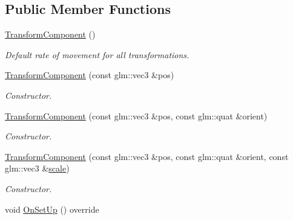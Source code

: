 \subsection*{Public Member Functions}
\begin{DoxyCompactItemize}
\item 
\hypertarget{class_transform_component_ace1cf2d7d2a7468e9cb3eb0ce382f446}{\hyperlink{class_transform_component_ace1cf2d7d2a7468e9cb3eb0ce382f446}{Transform\+Component} ()}\label{class_transform_component_ace1cf2d7d2a7468e9cb3eb0ce382f446}

\begin{DoxyCompactList}\small\item\em Default rate of movement for all transformations. \end{DoxyCompactList}\item 
\hypertarget{class_transform_component_a01037615eda19c3bbb51c99094839574}{\hyperlink{class_transform_component_a01037615eda19c3bbb51c99094839574}{Transform\+Component} (const glm\+::vec3 \&pos)}\label{class_transform_component_a01037615eda19c3bbb51c99094839574}

\begin{DoxyCompactList}\small\item\em Constructor. \end{DoxyCompactList}\item 
\hypertarget{class_transform_component_a05ce9d2b5a350a5d8d67ce6b323818d4}{\hyperlink{class_transform_component_a05ce9d2b5a350a5d8d67ce6b323818d4}{Transform\+Component} (const glm\+::vec3 \&pos, const glm\+::quat \&orient)}\label{class_transform_component_a05ce9d2b5a350a5d8d67ce6b323818d4}

\begin{DoxyCompactList}\small\item\em Constructor. \end{DoxyCompactList}\item 
\hypertarget{class_transform_component_aa823162adc73870484409dcdb8cc95f3}{\hyperlink{class_transform_component_aa823162adc73870484409dcdb8cc95f3}{Transform\+Component} (const glm\+::vec3 \&pos, const glm\+::quat \&orient, const glm\+::vec3 \&\hyperlink{class_transform_component_a759c702f0602108614a0a00503c2320a}{scale})}\label{class_transform_component_aa823162adc73870484409dcdb8cc95f3}

\begin{DoxyCompactList}\small\item\em Constructor. \end{DoxyCompactList}\item 
\hypertarget{class_transform_component_a8c09c13555d6d480ef0e3af9e3231ae2}{void \hyperlink{class_transform_component_a8c09c13555d6d480ef0e3af9e3231ae2}{On\+Set\+Up} () override}\label{class_transform_component_a8c09c13555d6d480ef0e3af9e3231ae2}


\end{DoxyCompactItemize}
